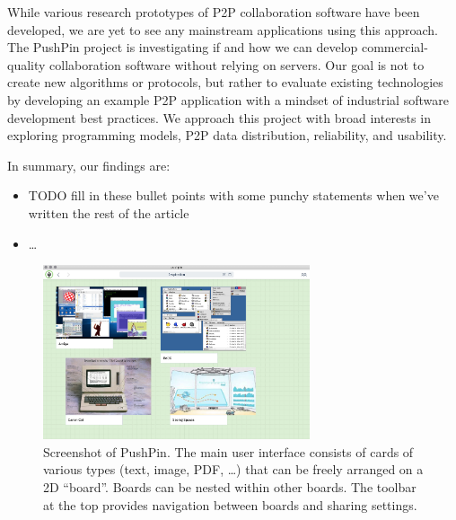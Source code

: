 \documentclass[sigplan,10pt]{acmart}
\begin{document}

While various research prototypes of P2P collaboration software have been developed, we are yet to see any mainstream applications using this approach.
The PushPin project is investigating if and how we can develop commercial-quality collaboration software without relying on servers.
Our goal is not to create new algorithms or protocols, but rather to evaluate existing technologies by developing an example P2P application with a mindset of industrial software development best practices.
We approach this project with broad interests in exploring programming models, P2P data distribution, reliability, and usability.

In summary, our findings are:
\begin{itemize}
    \item TODO fill in these bullet points with some punchy statements when we've written the rest of the article
    \item \dots
\end{itemize}




\begin{figure}
    \centering
    \includegraphics[width=0.7\textwidth]{pushpin.jpg}
    \caption{Screenshot of PushPin. The main user interface consists of cards of various types (text, image, PDF, \dots) that can be freely arranged on a 2D ``board''. Boards can be nested within other boards. The toolbar at the top provides navigation between boards and sharing settings.}
    \label{fig:pushpin}
\end{figure}
\end{document}
